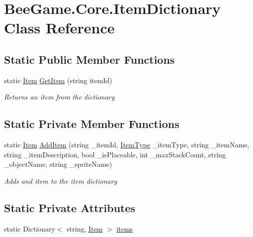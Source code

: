 \hypertarget{class_bee_game_1_1_core_1_1_item_dictionary}{}\section{Bee\+Game.\+Core.\+Item\+Dictionary Class Reference}
\label{class_bee_game_1_1_core_1_1_item_dictionary}
\subsection*{Static Public Member Functions}
\begin{DoxyCompactItemize}
\item 
static \hyperlink{struct_bee_game_1_1_items_1_1_item}{Item} \hyperlink{class_bee_game_1_1_core_1_1_item_dictionary_a936e5313065bf33e4ed0cd766fa0fedb}{Get\+Item} (string item\+Id)
\begin{DoxyCompactList}\small\item\em Returns an item from the dictionary \end{DoxyCompactList}\end{DoxyCompactItemize}
\subsection*{Static Private Member Functions}
\begin{DoxyCompactItemize}
\item 
static \hyperlink{struct_bee_game_1_1_items_1_1_item}{Item} \hyperlink{class_bee_game_1_1_core_1_1_item_dictionary_aa74683c6433f643da6967e10862ac026}{Add\+Item} (string \+\_\+item\+Id, \hyperlink{namespace_bee_game_1_1_enums_aa1fa1a04627915b8e72d3bb1c5c3fa82}{Item\+Type} \+\_\+item\+Type, string \+\_\+item\+Name, string \+\_\+item\+Description, bool \+\_\+is\+Placeable, int \+\_\+max\+Stack\+Count, string \+\_\+object\+Name, string \+\_\+sprite\+Name)
\begin{DoxyCompactList}\small\item\em Adds and item to the item dictionary \end{DoxyCompactList}\end{DoxyCompactItemize}
\subsection*{Static Private Attributes}
\begin{DoxyCompactItemize}
\item 
static Dictionary$<$ string, \hyperlink{struct_bee_game_1_1_items_1_1_item}{Item} $>$ \hyperlink{class_bee_game_1_1_core_1_1_item_dictionary_aa9828e91ace773227fd20008786b6a22}{items}
\end{DoxyCompactItemize}


